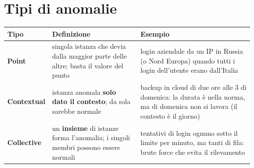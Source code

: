 \section{Tipi di anomalie}
\begin{center}
\small
\renewcommand{\arraystretch}{1.25}
\begin{tabularx}{\textwidth}{>{\bfseries}l X X}
\toprule
Tipo & Definizione & Esempio\\
\midrule
Point & singola istanza che devia dalla maggior parte delle altre; basta il valore del punto & login aziendale da un IP in Russia (o Nord Europa) quando tutti i login dell'utente erano dall'Italia\\
Contextual & istanza anomala \textbf{solo dato il contesto}; da sola sarebbe normale & backup in cloud di due ore alle 3 di domenica: la durata è nella norma, ma di domenica non si lavora (il contesto è il giorno)\\
Collective & un \textbf{insieme} di istanze forma l'anomalia; i singoli membri possono essere normali & tentativi di login ognuno sotto il limite per minuto, ma tanti di fila: brute force che evita il rilevamento\\
\bottomrule
\end{tabularx}
\end{center}

